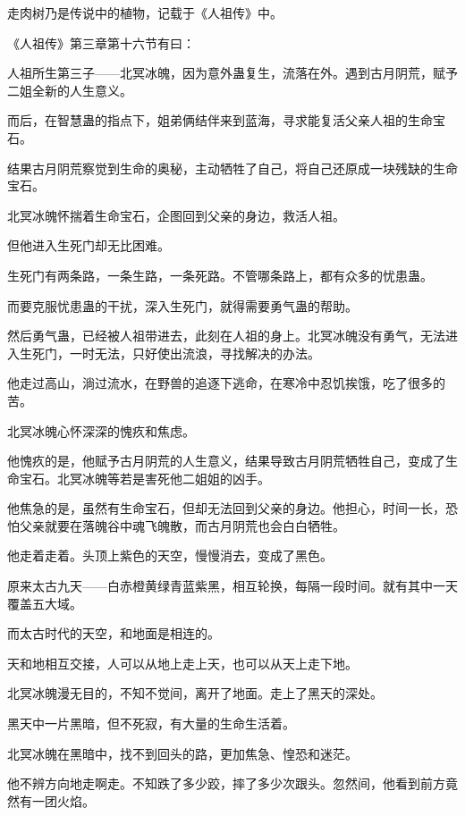 
\begin{this_body}

走肉树乃是传说中的植物，记载于《人祖传》中。

《人祖传》第三章第十六节有曰：

人祖所生第三子——北冥冰魄，因为意外蛊复生，流落在外。遇到古月阴荒，赋予二姐全新的人生意义。

而后，在智慧蛊的指点下，姐弟俩结伴来到蓝海，寻求能复活父亲人祖的生命宝石。

结果古月阴荒察觉到生命的奥秘，主动牺牲了自己，将自己还原成一块残缺的生命宝石。

北冥冰魄怀揣着生命宝石，企图回到父亲的身边，救活人祖。

但他进入生死门却无比困难。

生死门有两条路，一条生路，一条死路。不管哪条路上，都有众多的忧患蛊。

而要克服忧患蛊的干扰，深入生死门，就得需要勇气蛊的帮助。

然后勇气蛊，已经被人祖带进去，此刻在人祖的身上。北冥冰魄没有勇气，无法进入生死门，一时无法，只好使出流浪，寻找解决的办法。

他走过高山，淌过流水，在野兽的追逐下逃命，在寒冷中忍饥挨饿，吃了很多的苦。

北冥冰魄心怀深深的愧疚和焦虑。

他愧疚的是，他赋予古月阴荒的人生意义，结果导致古月阴荒牺牲自己，变成了生命宝石。北冥冰魄等若是害死他二姐姐的凶手。

他焦急的是，虽然有生命宝石，但却无法回到父亲的身边。他担心，时间一长，恐怕父亲就要在落魄谷中魂飞魄散，而古月阴荒也会白白牺牲。

他走着走着。头顶上紫色的天空，慢慢消去，变成了黑色。

原来太古九天——白赤橙黄绿青蓝紫黑，相互轮换，每隔一段时间。就有其中一天覆盖五大域。

而太古时代的天空，和地面是相连的。

天和地相互交接，人可以从地上走上天，也可以从天上走下地。

北冥冰魄漫无目的，不知不觉间，离开了地面。走上了黑天的深处。

黑天中一片黑暗，但不死寂，有大量的生命生活着。

北冥冰魄在黑暗中，找不到回头的路，更加焦急、惶恐和迷茫。

他不辨方向地走啊走。不知跌了多少跤，摔了多少次跟头。忽然间，他看到前方竟然有一团火焰。


\end{this_body}
